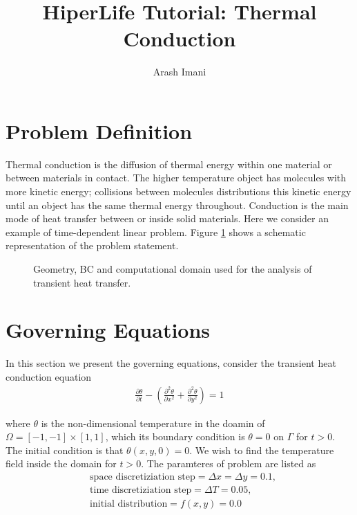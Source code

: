 \documentclass[]{article}
\begin{document}
\title{HiperLife Tutorial: Thermal Conduction}
\author[1]{Arash Imani}
\maketitle

\linenumbers

\section{Problem Definition} \label{sec: pd}
Thermal conduction is the diffusion of thermal energy within one material or between materials in contact. The higher temperature object has molecules with more kinetic energy; collisions between molecules distributions this kinetic energy until an object has the same thermal energy throughout. Conduction is the main mode of heat transfer between or inside solid materials. Here we consider an  example of time-dependent linear problem. Figure \ref{fig_SB} shows a schematic representation of the problem statement.
\begin{figure}[htbp]
	\centering
	
	\caption{Geometry, BC and computational domain used for the analysis of transient heat transfer.}
	\label{fig_SB}
\end{figure}
\section{Governing Equations} \label{sec: ge}
In this section we present the governing equations, consider the transient heat conduction equation \cite{reddy2014introduction}
\begin{equation}\label{eq1}
	\begin{aligned}
		\frac{\partial \theta}{\partial t} - (\frac{\partial^2 \theta}{\partial x^2}+\frac{\partial^2 \theta}{\partial y^2}) = 1
	\end{aligned}
\end{equation}

where $\theta$ is the non-dimensional temperature in the doamin of $\Omega=[-1,-1]\times[1,1]$, which its
boundary condition is $\theta = 0$ on $\Gamma$ for $t > 0$. The initial
condition is that $\theta(x, y, 0) = 0$. We wish to find the temperature field inside the domain for
$t > 0$.
The paramteres of problem are listed as
\begin{equation}\label{eq2}
	\begin{aligned}
		&\text{space discretiziation step}= \Delta x = \Delta y = 0.1, \\
		&\text{time discretiziation step}= \Delta T = 0.05, \\
		&\text{initial distribution}= f(x,y) = 0.0\\
	\end{aligned}
\end{equation}
\end{document}
